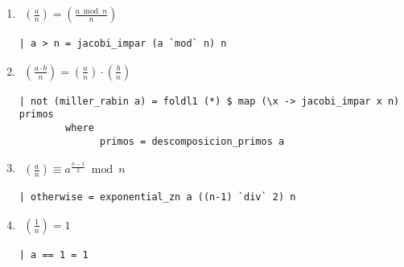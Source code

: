 \documentclass[10pt,spanish]{article}
\begin{document}
\begin{enumerate}[1.]
\item 
\begin{equation*}
    \begin{aligned}
    \left( \frac{a}{n} \right) = \left( \frac{a \bmod n}{n} \right)
    \end{aligned}
    \phantom{\hspace{18cm}}
\end{equation*}

\begin{verbatim}
| a > n = jacobi_impar (a `mod` n) n 
\end{verbatim}

\item 
\begin{equation*}
    \begin{aligned}
    \left( \frac{a \cdot b}{n} \right) = \left( \frac{a}{n} \right) \cdot \left( \frac{b}{n} \right)
    \end{aligned}
    \phantom{\hspace{18cm}}
\end{equation*}

\begin{verbatim}
| not (miller_rabin a) = foldl1 (*) $ map (\x -> jacobi_impar x n) primos
        where
              primos = descomposicion_primos a
\end{verbatim}

\item
\begin{equation*}
    \begin{aligned}
    \left( \frac{a}{n} \right) \equiv a^{\frac{n-1}{2}} \bmod n
    \end{aligned}
    \phantom{\hspace{18cm}}
\end{equation*}

\begin{verbatim}
| otherwise = exponential_zn a ((n-1) `div` 2) n
\end{verbatim}

\item
\begin{equation*}
    \begin{aligned}
    \left( \frac{1}{n} \right) = 1
    \end{aligned}
    \phantom{\hspace{18cm}}
\end{equation*}

\begin{verbatim}
| a == 1 = 1
\end{verbatim}


\end{enumerate}
\end{document}
